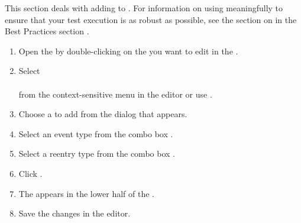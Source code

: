 


This section deals with adding \gdehandlers{} to \gdcases{}.  For information on using \gdehandlers{} meaningfully to ensure that your test execution is as robust as possible, see the section on \gdehandlers{} in the Best Practices section . 

\begin{enumerate}
\item Open the \gdtestcaseeditor{} by double-clicking on the \gdcase{} you want to edit in the \gdtestcasebrowser{}.   
\item Select\\
 \\from the context-sensitive menu in the editor or use . 


\item Choose a \gdcase{} to add from the dialog that appears.
\item Select an event type from the combo box .
\item Select a reentry type from the combo box . 
\item Click . 
\item The \gdehandler{} appears in the lower half of the \gdtestcaseeditor{}. 
\item Save the changes in the editor.
\end{enumerate}

